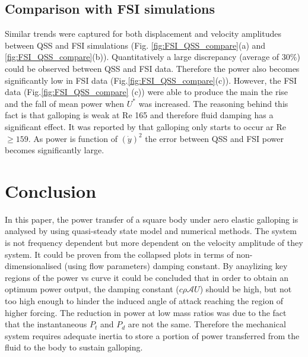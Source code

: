 \subsection{Comparison with FSI simulations}
 Similar trends were captured for both displacement and velocity amplitudes between QSS and FSI simulations (Fig. \ref{fig:FSI_QSS_compare}(a) and \ref{fig:FSI_QSS_compare}(b)). Quantitatively a large discrepancy (average of $30\%$) could be observed between QSS and FSI data. Therefore the power also becomes significantly low in FSI data (Fig.\ref{fig:FSI_QSS_compare}(c)). However, the FSI data (Fig.\ref{fig:FSI_QSS_compare} (c)) were able to produce the main the rise and the fall of mean power when $U^*$ was increased. The reasoning behind this fact is that galloping is weak at Re 165  and therefore fluid damping has a significant effect. It was reported by \cite{Barrero-Gil2009} that galloping only starts to occur ar Re $\geq 159$. As power is function of $(\dot{y})^2$ the error between QSS and FSI power becomes significantly large.  
 

 

\section{Conclusion}

In this paper, the power transfer of a square body under aero elastic galloping is analysed by using quasi-steady state model and numerical methods. The system is not frequency dependent but more dependent on the velocity amplitude of they system. It could be proven from the collapsed plots in terms of non-dimensionalised (using flow parameters) damping constant. By anaylizing key regions of the power vs \ustar curve it could be concluded that in order to obtain an optimum power output, the damping constant ($c\rho\mathcal{A}U$) should be high, but not too high enough to hinder the induced angle of attack reaching the region of higher forcing. The reduction in power at low mass ratios was due to the fact that the instantaneous $P_t$ and $P_d$ are not the same. Therefore the mechanical system requires adequate inertia to store a portion of power transferred from the fluid to the body to sustain galloping. 






 

 
 
 

 
 



 
 
 
 
 
 
 
 
 
 
  
 
 
